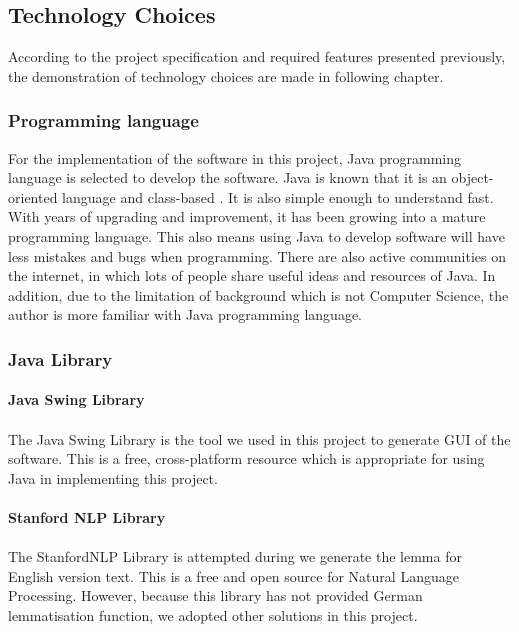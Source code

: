 \subsection{Technology Choices}
According to the project specification and required features presented previously, the demonstration of technology choices are made in following chapter.
\subsubsection{Programming language}
For the implementation of the software in this project, Java programming language is selected to develop the software. Java is known that it is an object-oriented language and class-based \cite{Gosling2014}. It is also simple enough to understand fast. With years of upgrading and improvement, it has been growing into a mature programming language. This also means using Java to develop software will have less mistakes and bugs when programming. There are also active communities on the internet, in which lots of people share useful ideas and resources of Java. In addition, due to the limitation of background which is not Computer Science, the author is more familiar with Java programming language.  

\subsubsection{Java Library}

\paragraph{Java Swing Library}
\paragraph[]{} The Java Swing Library is the tool we used in this project to generate GUI of the software. This is a free, cross-platform resource which is appropriate for using Java in implementing this project.

\paragraph{Stanford NLP Library}
\paragraph[]{} The StanfordNLP Library is attempted during we generate the lemma for English version text. This is a free and open source for Natural Language Processing. However, because this library has not provided German lemmatisation function, we adopted other solutions in this project.

